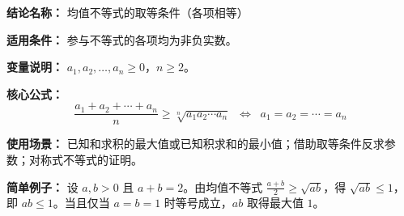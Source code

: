 \textbf{结论名称：} 均值不等式的取等条件（各项相等）

\textbf{适用条件：} 参与不等式的各项均为非负实数。

\textbf{变量说明：} $a_1,a_2,\dots,a_n \geq 0$，$n \geq 2$。

\textbf{核心公式：} \[ \boxed{\frac{a_1+a_2+\cdots +a_n}{n} \ge \sqrt[n]{a_1a_2\cdots a_n}\;\; \Longleftrightarrow\;\; a_1=a_2=\cdots =a_n } \]

\textbf{使用场景：} 已知和求积的最大值或已知积求和的最小值；借助取等条件反求参数；对称式不等式的证明。

\textbf{简单例子：} 设 $a,b>0$ 且 $a+b=2$。由均值不等式 $\frac{a+b}{2}\ge\sqrt{ab}$，得 $\sqrt{ab}\le 1$，即 $ab\le 1$。当且仅当 $a=b=1$ 时等号成立，$ab$ 取得最大值 $1$。